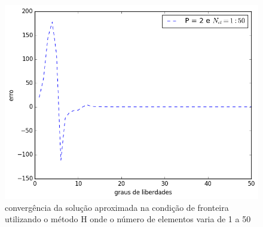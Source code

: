 \begin{figure}[H]
\centering
\includegraphics[width=.7\textwidth,center]{figuras/convergencia_fronteira_neuman_H.png}
\caption{convergência da solução aproximada na condição de fronteira utilizando o método H onde o número de elementos varia de 1 a 50 } 
\end{figure}
